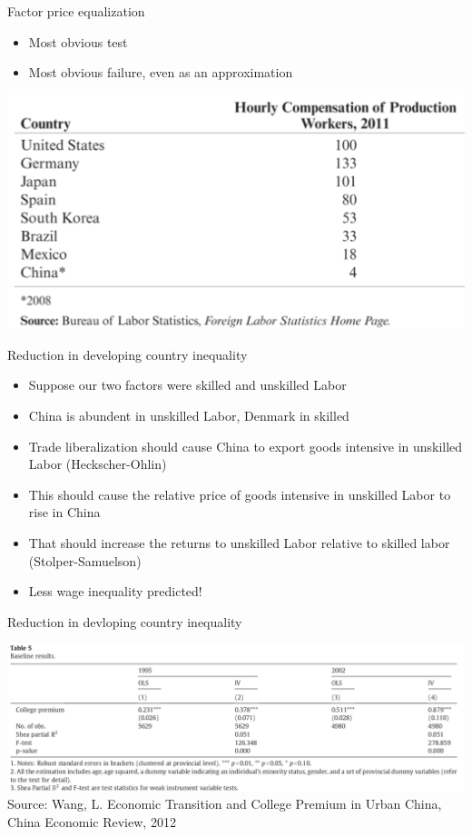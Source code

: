 \documentclass[ignorenonframetext,]{beamer}
\begin{document}
\begin{frame}{Factor price equalization}

    \begin{itemize}
        \item Most obvious test
        \item Most obvious failure, even as an approximation
    \end{itemize}
    \includegraphics[scale=0.2]{factor_price_differences.png}

\end{frame}

\begin{frame}{Reduction in developing country inequality}

    \begin{itemize}
        \item Suppose our two factors were skilled and unskilled Labor 
        \item China is abundent in unskilled Labor, Denmark in skilled
        \item Trade liberalization should cause China to export goods intensive in unskilled Labor (Heckscher-Ohlin)
        \item This should cause the relative price of goods intensive in unskilled Labor to rise in China
        \item That should increase the returns to unskilled Labor relative to skilled labor (Stolper-Samuelson)
        \item Less wage inequality predicted!
    \end{itemize}

\end{frame}

\begin{frame}{Reduction in devloping country inequality}

    \includegraphics[scale=0.25]{LWang_CER_2012.png}
    {\tiny Source: Wang, L. Economic Transition and College Premium in Urban China, China Economic Review, 2012}

\end{frame}
\end{document}
